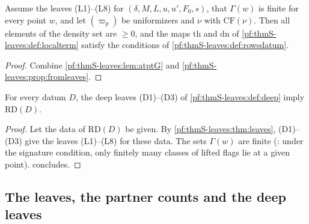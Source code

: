 \begin{theorem}\label{pf:thmS-leaves:thm:rowsdatumat}
Assume the leaves (L1)--(L8) for $(\delta,M,L,u,u',F_0,s)$, that $\Gamma(w)$ is finite for every point $w$, and let $(\varpi_p)$ be
uniformizers and $\nu$ with $\mathrm{CF}(\nu)$. Then all elements of the density set are $\ge0$, and the maps $\mathrm{th}$ and
$\mathrm{dn}$ of \cref{pf:thmS-leaves:def:localterm} satisfy the conditions of \cref{pf:thmS-leaves:def:rowsdatum}.
\end{theorem}

\begin{proof}
Combine \cref{pf:thmS-leaves:lem:atptG} and \cref{pf:thmS-leaves:prop:fromleaves}.
\end{proof}

\begin{theorem}\label{pf:thmS-leaves:thm:rowsdatum}
For every datum $D$, the deep leaves (D1)--(D3) of \cref{pf:thmS-leaves:def:deep} imply $\mathrm{RD}(D)$.
\end{theorem}

\begin{proof}
Let the data of $\mathrm{RD}(D)$ be given. By \cref{pf:thmS-leaves:thm:leaves}, (D1)--(D3) give the leaves (L1)--(L8) for these
data. The sets $\Gamma(w)$ are finite (: under the signature condition,
only finitely many classes of lifted flags lie at a given point).  concludes.
\end{proof}

\subsection{The leaves, the partner counts and the deep leaves}\label{pf:thmS-leaves:ss:leaves}

